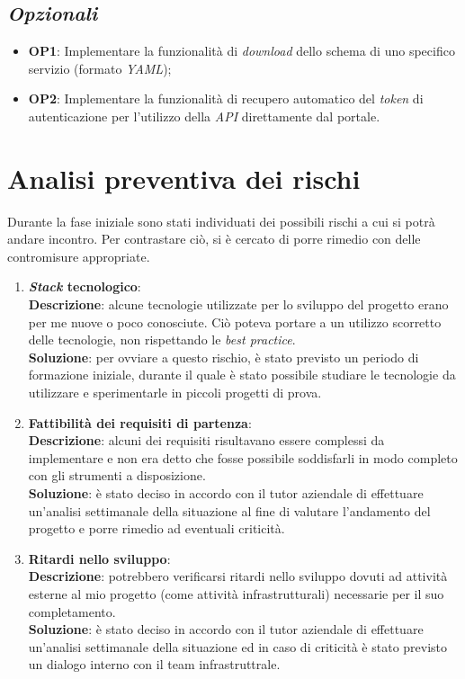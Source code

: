 \subsection*{\emph{Opzionali}}
\begin{itemize}
    \item \textbf{OP1}: Implementare la funzionalità di \textit{download} dello schema di uno specifico servizio (formato \textit{YAML});
    \item \textbf{OP2}: Implementare la funzionalità di recupero automatico del \textit{token} di autenticazione per l'utilizzo della \textit{API} direttamente dal portale.
\end{itemize}

\section{Analisi preventiva dei rischi}
Durante la fase iniziale sono stati individuati dei possibili rischi a cui si potrà andare incontro. Per contrastare ciò, si è cercato di porre rimedio con delle contromisure appropriate.
\begin{enumerate}
    \item \textbf{\textit{Stack} tecnologico}:\\
        \textbf{Descrizione}: alcune tecnologie utilizzate per lo sviluppo del progetto erano per me nuove o poco conosciute. Ciò poteva portare a un utilizzo scorretto delle tecnologie, non rispettando le \textit{best practice}.\\
        \textbf{Soluzione}: per ovviare a questo rischio, è stato previsto un periodo di formazione iniziale, durante il quale è stato possibile studiare le tecnologie da utilizzare e sperimentarle in piccoli progetti di prova.\\
    \item \textbf{Fattibilità dei requisiti di partenza}:\\
        \textbf{Descrizione}: alcuni dei requisiti risultavano essere complessi da implementare e non era detto che fosse possibile soddisfarli in modo completo con gli strumenti a disposizione.\\
        \textbf{Soluzione}: è stato deciso in accordo con il tutor aziendale di effettuare un'analisi settimanale della situazione al fine di valutare l'andamento del progetto e porre rimedio ad eventuali criticità.\\ 
    \item \textbf{Ritardi nello sviluppo}:\\
        \textbf{Descrizione}: potrebbero verificarsi ritardi nello sviluppo dovuti ad attività esterne al mio progetto (come attività infrastrutturali) necessarie per il suo completamento.\\
        \textbf{Soluzione}: è stato deciso in accordo con il tutor aziendale di effettuare un'analisi settimanale della situazione ed in caso di criticità è stato previsto un dialogo interno con il team infrastruttrale.\\
\end{enumerate}
